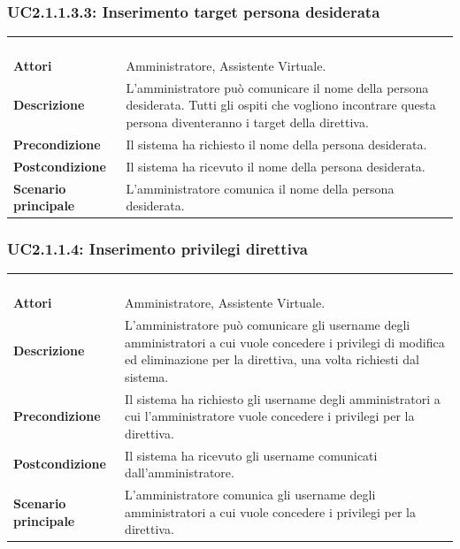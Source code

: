 \subsubsection{UC2.1.1.3.3: Inserimento target persona desiderata}
\label{UC2.1.1.3.3}
\begin{longtable}{l|p{10cm}}
\rowcolor[gray]{0.8} \multicolumn{2}{c}{} \\
\rowcolor[gray]{0.8} \multicolumn{2}{c}{\textbf{UC2.1.1.3.3 - Inserimento target persona desiderata}} \\
\rowcolor[gray]{0.8} \multicolumn{2}{c}{} \\
\hline
&\\
\textbf{Attori} & Amministratore, Assistente Virtuale.\\[7pt]
\textbf{Descrizione} & L'amministratore può comunicare il nome della persona desiderata. Tutti gli ospiti che vogliono incontrare questa persona diventeranno i target della direttiva.\\[7pt]
\textbf{Precondizione} & Il sistema ha richiesto il nome della persona desiderata.\\[7pt]
\textbf{Postcondizione} & Il sistema ha ricevuto il nome della persona desiderata.\\[7pt]
\textbf{Scenario principale} &L'amministratore comunica il nome della persona desiderata.\\[7pt]\hline
\end{longtable}

\subsubsection{UC2.1.1.4: Inserimento privilegi direttiva}
\label{UC2.1.1.4}
\begin{longtable}{l|p{10cm}}
\rowcolor[gray]{0.8} \multicolumn{2}{c}{} \\
\rowcolor[gray]{0.8} \multicolumn{2}{c}{\textbf{UC2.1.1.4 - Inserimento privilegi direttiva}} \\
\rowcolor[gray]{0.8} \multicolumn{2}{c}{} \\
\hline
&\\
\textbf{Attori} & Amministratore, Assistente Virtuale.\\[7pt]
\textbf{Descrizione} & L'amministratore può comunicare gli username degli amministratori a cui vuole concedere i privilegi di modifica ed eliminazione per la direttiva, una volta richiesti dal sistema.\\[7pt]
\textbf{Precondizione} & Il sistema ha richiesto gli username degli amministratori a cui l'amministratore vuole concedere i privilegi per la direttiva.\\[7pt]
\textbf{Postcondizione} & Il sistema ha ricevuto gli username comunicati dall'amministratore.\\[7pt]
\textbf{Scenario principale} &L'amministratore comunica gli username degli amministratori a cui vuole concedere i privilegi per la direttiva.\\[7pt]\hline
\end{longtable}


